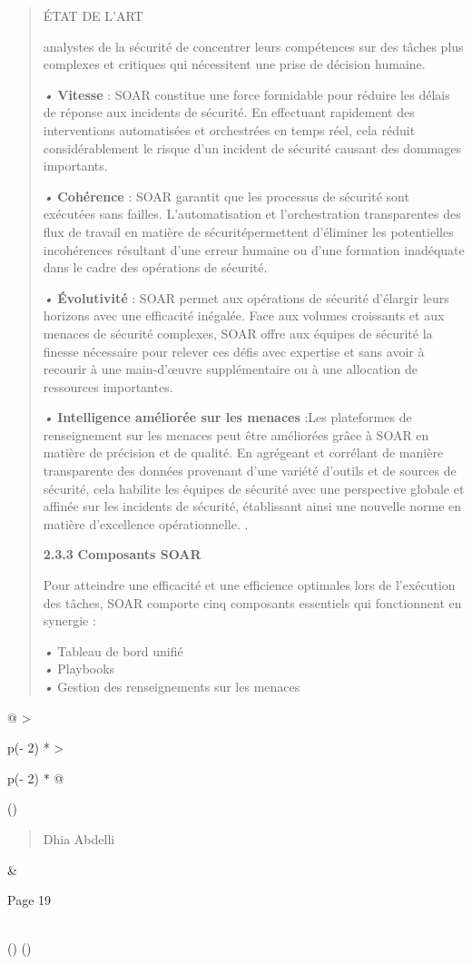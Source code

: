 \documentclass[
]{article}
\begin{document}
\begin{quote}
ÉTAT DE L'ART

analystes de la sécurité de concentrer leurs compétences sur des tâches
plus complexes et critiques qui nécessitent une prise de décision
humaine.

\emph{•} \textbf{Vitesse} : SOAR constitue une force formidable pour
réduire les délais de réponse aux incidents de sécurité. En effectuant
rapidement des interventions automatisées et orchestrées en temps réel,
cela réduit considérablement le risque d'un incident de sécurité causant
des dommages importants.

\emph{•} \textbf{Cohérence} : SOAR garantit que les processus de
sécurité sont exécutées sans failles. L'automatisation et
l'orchestration transparentes des flux de travail en matière de
sécuritépermettent d'éliminer les potentielles incohérences résultant
d'une erreur humaine ou d'une formation inadéquate dans le cadre des
opérations de sécurité.

\emph{•} \textbf{Évolutivité} : SOAR permet aux opérations de sécurité
d'élargir leurs horizons avec une efficacité inégalée. Face aux volumes
croissants et aux menaces de sécurité complexes, SOAR offre aux équipes
de sécurité la finesse nécessaire pour relever ces défis avec expertise
et sans avoir à recourir à une main-d'œuvre supplémentaire ou à une
allocation de ressources importantes.

\emph{•} \textbf{Intelligence améliorée sur les menaces} :Les
plateformes de renseignement sur les menaces peut être améliorées grâce
à SOAR en matière de précision et de qualité. En agrégeant et corrélant
de manière transparente des données provenant d'une variété d'outils et
de sources de sécurité, cela habilite les équipes de sécurité avec une
perspective globale et affinée sur les incidents de sécurité,
établissant ainsi une nouvelle norme en matière d'excellence
opérationnelle. .

\textbf{2.3.3} \textbf{Composants SOAR}

Pour atteindre une efficacité et une efficience optimales lors de
l'exécution des tâches, SOAR comporte cinq composants essentiels qui
fonctionnent en synergie :

\emph{•} Tableau de bord unifié\\
\emph{•} Playbooks\\
\emph{•} Gestion des renseignements sur les menaces
\end{quote}

\begin{longtable}[]{@{}
  >{\raggedright\arraybackslash}p{(\columnwidth - 2\tabcolsep) * }
  >{\raggedright\arraybackslash}p{(\columnwidth - 2\tabcolsep) * }@{}}
\toprule()
\begin{minipage}[b]{\linewidth}\raggedright
\begin{quote}
Dhia Abdelli
\end{quote}
\end{minipage} & \begin{minipage}[b]{\linewidth}\raggedright
Page 19
\end{minipage} \\
\midrule()
\endhead
\bottomrule()
\end{longtable}
\end{document}
